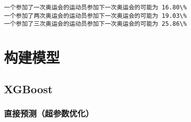 \documentclass[11pt]{article}
\begin{document}
    \begin{Verbatim}[commandchars=\\\{\}]
一个参加了一次奥运会的运动员参加下一次奥运会的可能为 16.80\%
一个参加了两次奥运会的运动员参加下一次奥运会的可能为 19.03\%
一个参加了三次奥运会的运动员参加下一次奥运会的可能为 25.86\%
    \end{Verbatim}

    \section{构建模型}\label{ux6784ux5efaux6a21ux578b}

    \subsection{XGBoost}\label{xgboost}

    \subsubsection{直接预测（超参数优化）}\label{ux76f4ux63a5ux9884ux6d4bux8d85ux53c2ux6570ux4f18ux5316}
\end{document}
